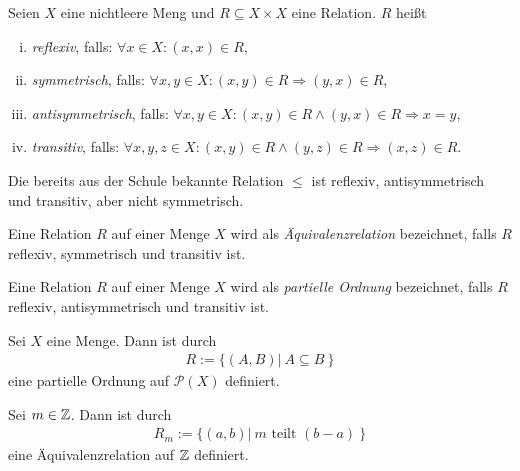 \begin{mydef} 
    Seien $X$ eine nichtleere Meng und $R \subseteq X \times X$ eine Relation. $R$ heißt
    \begin{enumerate}[(i)]
        \item 
        \textit{reflexiv}, falls: $\forall x \in X: (x,x) \in R$,
        \item 
        \textit{symmetrisch}, falls: $\forall x,y \in X : (x,y) \in R \Rightarrow (y,x) \in R$,
        \item 
        \textit{antisymmetrisch}, falls: $\forall x,y \in X: (x,y) \in R \wedge (y,x) \in R \Rightarrow x=y$,
        \item 
        \textit{transitiv}, falls: $\forall x,y,z \in X: (x,y) \in R \wedge (y,z) \in R \Rightarrow (x,z) \in R$. 
    \end{enumerate}
\end{mydef}

\begin{example}
    Die bereits aus der Schule bekannte Relation $\leq$ ist reflexiv, antisymmetrisch und transitiv, aber nicht symmetrisch. 
\end{example}

\begin{mydef}
    Eine Relation $R$ auf einer Menge $X$ wird als \textit{Äquivalenzrelation} bezeichnet, falls $R$ reflexiv, symmetrisch und transitiv ist. 
\end{mydef}

\begin{mydef}
    Eine Relation $R$ auf einer Menge $X$ wird als \textit{partielle Ordnung} bezeichnet, falls $R$ reflexiv, antisymmetrisch und transitiv ist. 
\end{mydef}

\begin{proposition}
    Sei $X$ eine Menge. Dann ist durch 
    \begin{align*}
        R := \{ (A,B) | \  A \subseteq B \ \}
    \end{align*}
    eine partielle Ordnung auf $\mathcal{P}(X)$ definiert. 
\end{proposition}



\begin{proposition}
    Sei $m \in \mathbb{Z}$. Dann ist durch 
    \begin{align*}
        R_m := \{(a,b) | \ m \text{ teilt } (b-a) \ \}
    \end{align*}
    eine Äquivalenzrelation auf $\mathbb{Z}$ definiert. 
\end{proposition}

